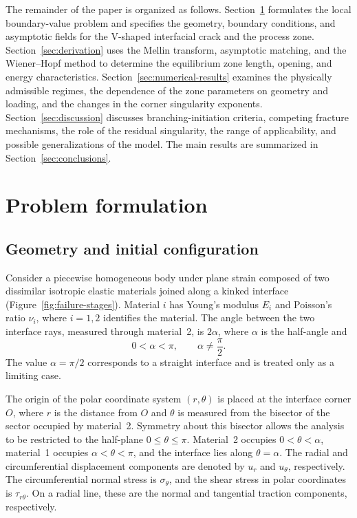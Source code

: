 \documentclass[pdflatex,iicol,sn-mathphys-ay]{sn-jnl}
\begin{document}
The remainder of the paper is organized as follows. Section~\ref{sec:problem}
formulates the local boundary-value problem and specifies the geometry,
boundary conditions, and asymptotic fields for the V-shaped interfacial crack
and the process zone. Section~\ref{sec:derivation} uses the Mellin transform,
asymptotic matching, and the Wiener--Hopf method to determine the equilibrium
zone length, opening, and energy characteristics. Section~\ref{sec:numerical-results}
examines the physically admissible regimes, the dependence of the zone
parameters on geometry and loading, and the changes in the corner singularity
exponents. Section~\ref{sec:discussion} discusses branching-initiation
criteria, competing fracture mechanisms, the role of the residual
singularity, the range of applicability, and possible generalizations of the
model. The main results are summarized in Section~\ref{sec:conclusions}.


\section{Problem formulation}
\label{sec:problem}
\providecommand{\AsymptoticsAppendix}{Appendix~\ref{app:asymptotics}}

\subsection{Geometry and initial configuration}
\label{subsec:geometry}

Consider a piecewise homogeneous body under plane strain composed of two
dissimilar isotropic elastic materials joined along a kinked interface
(Figure~\ref{fig:failure-stages}).
Material $i$ has Young's modulus $E_i$ and Poisson's ratio $\nu_i$, where
$i=1,2$ identifies the material. The angle between the two interface rays,
measured through material~2, is $2\alpha$, where $\alpha$ is the half-angle and
\begin{equation*}
  0<\alpha<\pi, \qquad \alpha\ne\frac{\pi}{2}.
\end{equation*}
The value $\alpha=\pi/2$ corresponds to a straight interface and is treated
only as a limiting case.

The origin of the polar coordinate system $(r,\theta)$ is placed at the
interface corner $O$, where $r$ is the distance from $O$ and $\theta$ is
measured from the bisector of the sector occupied by material~2. Symmetry
about this bisector allows the analysis to be restricted to the half-plane
$0\leq\theta\leq\pi$. Material~2 occupies $0<\theta<\alpha$, material~1
occupies $\alpha<\theta<\pi$, and the interface lies along
$\theta=\alpha$. The radial and circumferential displacement components
are denoted by $u_r$ and $u_\theta$, respectively. The circumferential normal
stress is $\sigma_\theta$, and the shear stress in polar coordinates is
$\tau_{r\theta}$. On a radial line, these are the normal and tangential
traction components, respectively.
\end{document}
